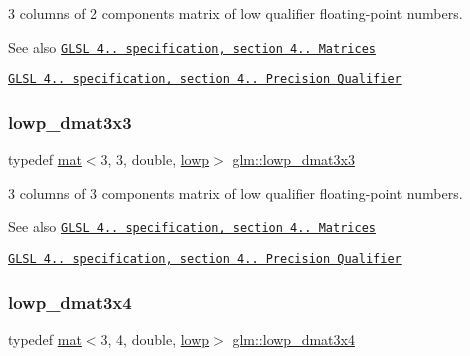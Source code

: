 3 columns of 2 components matrix of low qualifier floating-\/point numbers.

\begin{DoxySeeAlso}{See also}
\href{http://www.opengl.org/registry/doc/GLSLangSpec.4.20.8.pdf}{\tt G\+L\+SL 4.. specification, section 4.. Matrices} 

\href{http://www.opengl.org/registry/doc/GLSLangSpec.4.20.8.pdf}{\tt G\+L\+SL 4.. specification, section 4.. Precision Qualifier} 
\end{DoxySeeAlso}
\mbox{\label{group__core__precision_gacc5689588709eb4ccf582f21cd9af38c}} 
\subsubsection{\texorpdfstring{lowp\+\_\+dmat3x3}{lowp\_dmat3x3}}
{\footnotesize\ttfamily typedef \hyperlink{structglm_1_1mat}{mat}$<$3, 3, double, \hyperlink{namespaceglm_a36ed105b07c7746804d7fdc7cc90ff25ae161af3fc695e696ce3bf69f7332bc2d}{lowp}$>$ \hyperlink{group__core__precision_gacc5689588709eb4ccf582f21cd9af38c}{glm\+::lowp\+\_\+dmat3x3}}

3 columns of 3 components matrix of low qualifier floating-\/point numbers.

\begin{DoxySeeAlso}{See also}
\href{http://www.opengl.org/registry/doc/GLSLangSpec.4.20.8.pdf}{\tt G\+L\+SL 4.. specification, section 4.. Matrices} 

\href{http://www.opengl.org/registry/doc/GLSLangSpec.4.20.8.pdf}{\tt G\+L\+SL 4.. specification, section 4.. Precision Qualifier} 
\end{DoxySeeAlso}
\mbox{\label{group__core__precision_ga5a806e50b4cb26784620e98c8c03f03b}} 
\subsubsection{\texorpdfstring{lowp\+\_\+dmat3x4}{lowp\_dmat3x4}}
{\footnotesize\ttfamily typedef \hyperlink{structglm_1_1mat}{mat}$<$3, 4, double, \hyperlink{namespaceglm_a36ed105b07c7746804d7fdc7cc90ff25ae161af3fc695e696ce3bf69f7332bc2d}{lowp}$>$ \hyperlink{group__core__precision_ga5a806e50b4cb26784620e98c8c03f03b}{glm\+::lowp\+\_\+dmat3x4}}

